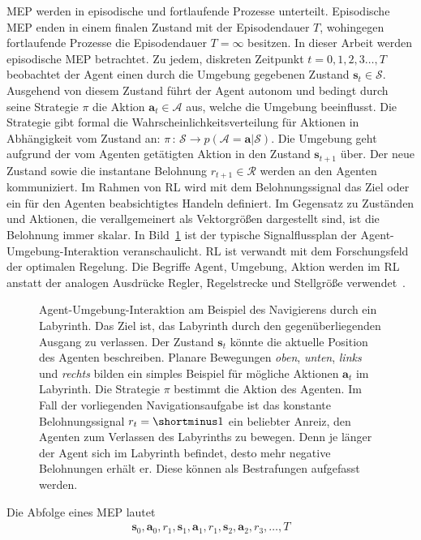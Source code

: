 MEP werden in episodische und fortlaufende Prozesse unterteilt. Episodische MEP enden in einem finalen Zustand mit der Episodendauer $T$, wohingegen fortlaufende Prozesse die Episodendauer $T = \infty$ besitzen. In dieser Arbeit werden episodische MEP betrachtet. Zu jedem, diskreten Zeitpunkt $t = 0,1,2,3\dots,T$ beobachtet der Agent einen durch die Umgebung gegebenen Zustand $\bm{s}_t \in \mathcal{S}$. Ausgehend von diesem Zustand führt der Agent autonom und bedingt durch seine Strategie $\pi$ die Aktion $\bm{a}_t \in \mathcal{A}$ aus, welche die Umgebung beeinflusst. Die Strategie gibt formal die Wahrscheinlichkeitsverteilung für Aktionen in Abhängigkeit vom Zustand an: 
$\pi \, :\, \mathcal{S} \rightarrow p(\mathcal{A}=\bm{a}|\mathcal{S})$. 
Die Umgebung geht aufgrund der vom Agenten getätigten Aktion in den Zustand $\bm{s}_{t+1}$ über. Der neue Zustand sowie die instantane Belohnung $r_{t+1} \in \mathcal{R}$ werden an den Agenten kommuniziert. Im Rahmen von RL wird mit dem Belohnungssignal das Ziel oder ein für den Agenten beabsichtigtes Handeln definiert. Im Gegensatz zu Zuständen und Aktionen, die verallgemeinert als Vektorgrößen dargestellt sind, ist die Belohnung immer skalar.
In Bild~\ref{fig:agent_umgebung} ist der typische Signalflussplan der Agent-Umgebung-Interaktion veranschaulicht. RL ist verwandt mit dem Forschungsfeld der optimalen Regelung. Die Begriffe Agent, Umgebung, Aktion werden im RL anstatt der analogen Ausdrücke Regler, Regelstrecke und Stellgröße verwendet~\cite{SB98}.
\begin{figure}[!b]
\centering
\def\svgwidth{0.8\textwidth}

\caption[Agent-Umgebung-Interaktion]{Agent-Umgebung-Interaktion am Beispiel des Navigierens durch ein Labyrinth. Das Ziel ist, das Labyrinth durch den gegenüberliegenden Ausgang zu verlassen. Der Zustand $\bm{s}_t$ könnte die aktuelle Position des Agenten beschreiben. Planare Bewegungen \textit{oben}, \textit{unten}, \textit{links} und \textit{rechts} bilden ein simples Beispiel für mögliche Aktionen $\bm{a}_t$ im Labyrinth. Die Strategie $\pi$ bestimmt die Aktion des Agenten. Im Fall der vorliegenden Navigationsaufgabe ist das konstante Belohnungssignal $r_t= \shortminus 1$ ein beliebter Anreiz, den Agenten zum Verlassen des Labyrinths zu bewegen. Denn je länger der Agent sich im Labyrinth befindet, desto mehr negative Belohnungen erhält er. Diese können als Bestrafungen aufgefasst werden.}
\label{fig:agent_umgebung}
\end{figure}
Die Abfolge eines MEP lautet
\begin{align*}
\bm{s}_0, \bm{a}_0, r_1, \bm{s}_1, \bm{a}_1, r_1, \bm{s}_2, \bm{a}_2, r_3, \dots, T
\end{align*}

